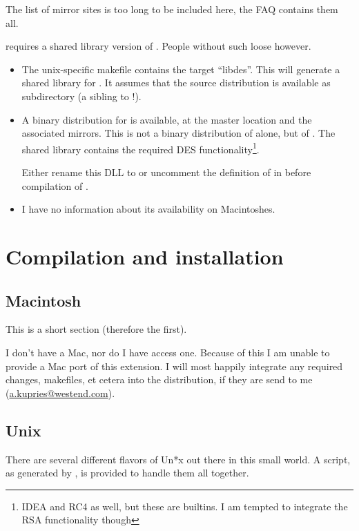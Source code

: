 The list of mirror sites is too long to be included here, the FAQ
contains them all.


\trf{} requires a shared library version of . People
without such  loose however.

\begin {itemize}
\item	The unix-specific makefile contains the target ``libdes''. This
	will generate a shared library for . It assumes that the
	 source distribution is available as subdirectory
	 (a sibling to  !).

\item	A binary distribution for \win{} is available, at the master
	location and the associated mirrors. This is not a binary
	distribution of  alone, but of . The
	shared library  contains the required DES
	functionality\footnote {IDEA and RC4 as well, but these are
	\trf {} builtins. I am tempted to integrate the RSA
	functionality though}.

	Either rename this DLL to  or uncomment the
	definition of  in  before
	compilation of \trf {}.

\item	I have no information about its availability on Macintoshes.
\end   {itemize}


\chapter {Compilation and installation}
\section {Macintosh}

	This is a short section (therefore the first).

	I don't have a Mac, nor do I have access one. Because
	of this I am unable to provide a Mac port of this
	extension.  I will most happily integrate any required
	changes, makefiles, et cetera into the distribution,
	if they are send to me (\url {a.kupries@westend.com}).


\section {Unix}

There are several different flavors of Un*x out there in this small
world. A  script, as generated by , is provided to handle them all together.

